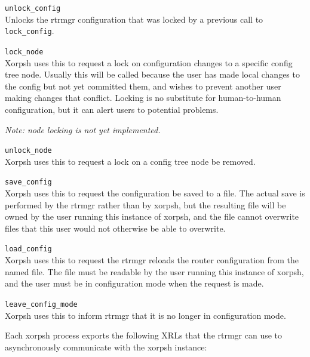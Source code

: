 \documentclass[11pt]{article}
\begin{document}
\begin{description}
  \item{\tt unlock\_config} \\Unlocks the rtrmgr configuration that was
locked by a previous call to {\tt lock\_config}.

  \item{\tt lock\_node} \\Xorpsh uses this to request a lock on
configuration changes to a specific config tree node.  Usually this
will be called because the user has made local changes to the config
but not yet committed them, and wishes to prevent another user making
changes that conflict.  Locking is no substitute for human-to-human
configuration, but it can alert users to potential problems.

{\it Note: node locking is not yet implemented.}

  \item{\tt unlock\_node} \\Xorpsh uses this to request a lock on a
config tree node be removed.

  \item{\tt save\_config} \\Xorpsh uses this to request the
configuration be saved to a file.  The actual save is performed by the
rtrmgr rather than by xorpsh, but the resulting file will be owned by
the user running this instance of xorpsh, and the file cannot
overwrite files that this user would not otherwise be able to
overwrite.

  \item{\tt load\_config} \\Xorpsh uses this to request the rtrmgr reloads
the router configuration from the named file.  The file must be
readable by the user running this instance of xorpsh, and the user
must be in configuration mode when the request is made.

  \item{\tt leave\_config\_mode} \\Xorpsh uses this to inform rtrmgr that
it is no longer in configuration mode.

\end{description}

\vspace{0.2in}
Each xorpsh process exports the following XRLs that the rtrmgr can use
to asynchronously communicate with the xorpsh instance:
\end{document}
